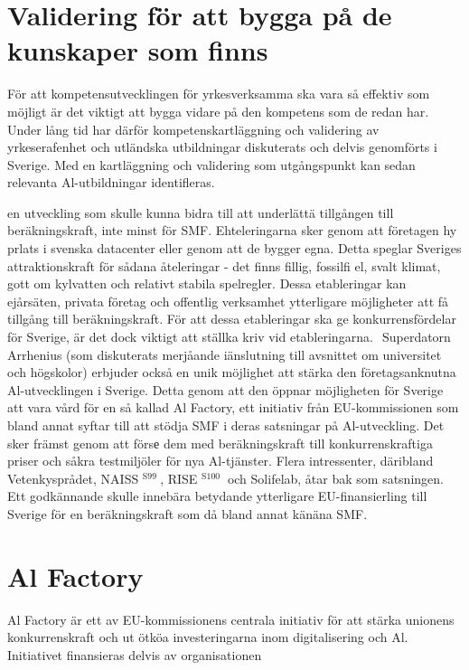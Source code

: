 {\section*{Validering för att bygga på de kunskaper som finns}
För att kompetensutvecklingen för yrkesverksamma ska vara så effektiv som möjligt är det viktigt att bygga vidare på den kompetens som de redan har. Under lång tid har därför kompetenskartläggning och validering av yrkeserafenhet och utländska utbildningar diskuterats och delvis genomförts i Sverige. Med en kartläggning och validering som utgångspunkt kan sedan relevanta Al-utbildningar identifleras.

en utveckling som skulle kunna bidra till att underlättä tillgången till beräkningskraft, inte minst för SMF. Ehteleringarna sker genom att företagen hy prlats i svenska datacenter eller genom att de bygger egna. Detta speglar Sveriges attraktionskraft för sådana åteleringar - det finns fillig, fossilfi el, svalt klimat, gott om kylvatten och relativt stabila spelregler. Dessa etableringar kan ejårsäten, privata företag och offentlig verksamhet ytterligare möjligheter att få tillgång till beräkningskraft. För att dessa etableringar ska ge konkurrensfördelar för Sverige, är det dock viktigt att ställka kriv vid etableringarna. \({ }^{}\)
Superdatorn Arrhenius (som diskuterats merjåande iänslutning till avsnittet om universitet och
högskolor) erbjuder också en unik möjlighet att stärka den företagsanknutna Al-utvecklingen i Sverige. Detta genom att den öppnar möjligheten för Sverige att vara vård för en så kallad Al Factory, ett initiativ från EU-kommissionen som bland annat syftar till att stödja SMF i deras satsningar på Al-utveckling. Det sker främst genom att försе dem med beräkningskraft till konkurrenskraftiga priser och såkra testmiljöler för nya Al-tjänster. Flera intressenter, däribland Vetenkysprådet, NAISS \({ }^{\text {S99 }}\), RISE \({ }^{\text {S100 }}\) och Solifelab, åtar bak som satsningen. Ett godkännande skulle innebära betydande ytterligare EU-finansierling till Sverige för en beräkningskraft som då bland annat känäna SMF.
\section*{Al Factory}
Al Factory är ett av EU-kommissionens centrala initiativ för att stärka unionens konkurrenskraft och ut ötköa investeringarna inom digitalisering och Al. Initiativet finansieras delvis av organisationen
}
